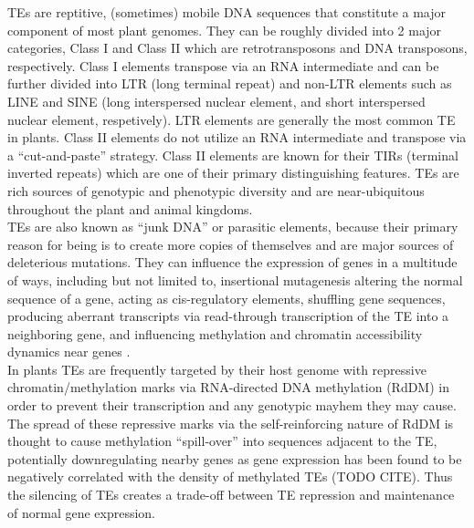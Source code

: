 \documentclass[fleqn,10pt]{olplainarticle}
\begin{document}
TEs are reptitive, (sometimes) mobile DNA sequences that constitute a major component of most plant genomes.
They can be roughly divided into 2 major categories, Class I and Class II which are retrotransposons and DNA transposons, respectively.
Class I elements transpose via an RNA intermediate and can be further divided into LTR (long terminal repeat) and non-LTR elements such as LINE and SINE (long interspersed nuclear element, and short interspersed nuclear element, respetively).
LTR elements are generally the most common TE in plants.
Class II elements do not utilize an RNA intermediate and transpose via a ``cut-and-paste'' strategy.
Class II elements are known for their TIRs (terminal inverted repeats) which are one of their primary distinguishing features.
TEs are rich sources of genotypic and phenotypic diversity and are near-ubiquitous throughout the plant and animal kingdoms. \\

TEs are also known as ``junk DNA'' or parasitic elements, because their primary reason for being is to create more copies of themselves and are major sources of deleterious mutations.
They can influence the expression of genes in a multitude of ways, including but not limited to, insertional mutagenesis altering the normal sequence of a gene, acting as cis-regulatory elements, shuffling gene sequences, producing aberrant transcripts via read-through transcription of the TE into a neighboring gene, and influencing methylation and chromatin accessibility dynamics near genes \cite{Lisch2013,Choi2018a}.\\

In plants TEs are frequently targeted by their host genome with repressive chromatin/methylation marks via RNA-directed DNA methylation (RdDM) in order to prevent their transcription and any genotypic mayhem they may cause. 
The spread of these repressive marks via the self-reinforcing nature of RdDM is thought to cause methylation ``spill-over'' into sequences adjacent to the TE, potentially downregulating nearby genes as gene expression has been found to be negatively correlated with the density of methylated TEs (TODO CITE).
Thus the silencing of TEs creates a trade-off between TE repression and maintenance of normal gene expression. \\
\end{document}
